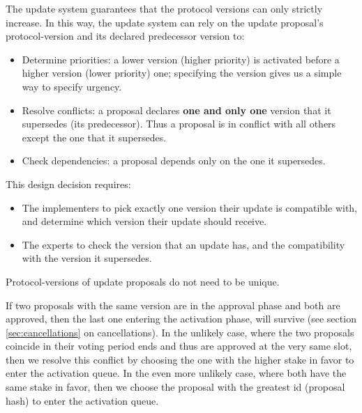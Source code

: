 The update system guarantees that the protocol versions can only strictly
increase. In this way, the update system can rely on the update proposal's
protocol-version and its declared predecessor version to:
\begin{itemize}
	\item Determine priorities: a lower version (higher priority) is activated 
	before a higher version (lower priority) one; specifying the version gives 
	us a 
	simple way to specify urgency.
	\item Resolve conflicts: a proposal declares \textbf{one and only one} 
	version
	that it supersedes (its predecessor). Thus a proposal is in conflict with 
	all
	others except the one that it supersedes.
	\item Check dependencies: a proposal depends only on the one it supersedes.
\end{itemize}
This design decision requires:
\begin{itemize}
	\item The implementers to pick exactly one version their update is 
	compatible
	with, and determine which version their update should receive.
	\item The experts to check the version that an update has, and the 
	compatibility
	with the version it supersedes.
\end{itemize}

Protocol-versions of update proposals do not need to be unique. 


If two proposals with the same version are in the approval phase and both are 
approved, then the last one entering the activation phase, will survive (see 
section \ref{sec:cancellations} on cancellations). In the unlikely case, where 
the two proposals coincide in their voting period ends and thus are approved at 
the very same slot, then we resolve this conflict by choosing the one with the 
higher stake in favor to enter the activation queue. In the even more unlikely 
case, where both have the same stake in favor, then we choose the proposal with 
the greatest id (proposal hash) to enter the activation queue.

